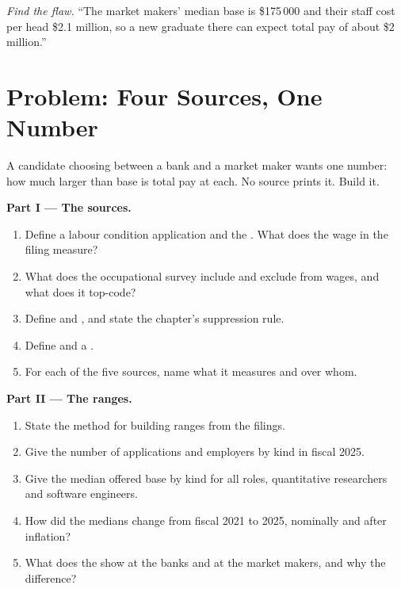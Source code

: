 \begin{exercise}[$\star\star\star$]\label{exo:in:pay-levels-by-role-firm-type-and-seniority:8}
\emph{Find the flaw.} ``The market makers' median base is \$175\,000 and their staff cost per head \$2.1 million, so a
new graduate there can expect total pay of about \$2 million.''
\end{exercise}

\section{Problem: Four Sources, One Number}

\begin{problem}\label{pb:in:pay-levels-by-role-firm-type-and-seniority:1}
A candidate choosing between a bank and a market maker wants one number: how much larger than base is total pay at each.
No source prints it. Build it.

\medskip\noindent\textbf{Part I --- The sources.}
\begin{enumerate}
\item Define a labour condition application and the . What does the wage in the filing measure?
\item What does the occupational survey include and exclude from wages, and what does it top-code?
\item Define  and , and state the chapter's suppression rule.
\item Define  and a .
\item For each of the five sources, name what it measures and over whom.
\end{enumerate}

\medskip\noindent\textbf{Part II --- The ranges.}
\begin{enumerate}[resume]
\item State the method for building ranges from the filings.
\item Give the number of applications and employers by kind in fiscal 2025.
\item Give the median offered base by kind for all roles, quantitative researchers and software engineers.
\item How did the medians change from fiscal 2021 to 2025, nominally and after inflation?
\item What does the  show at the banks and at the market makers, and why the difference?
\end{enumerate}


\end{problem}
